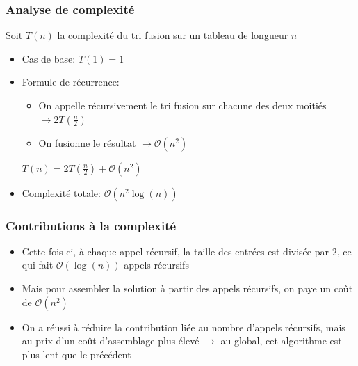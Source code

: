 \documentclass[aspectratio=169]{beamer}
\begin{document}
\begin{frame}
    \frametitle{Analyse de complexité}
    Soit \(T(n)\) la complexité du tri fusion sur un tableau de longueur \(n\)

    \begin{itemize}
    \item Cas de base: \(T(1) = 1\)
    \item Formule de récurrence:
      \begin{itemize}
      \item On appelle récursivement le tri fusion sur chacune des deux moitiés
        \(\to 2T(\frac{n}{2})\)
      \item On fusionne le résultat \(\to \mathcal{O}(n^{2})\)
      \end{itemize}
      \alert{\(T(n) = 2T(\frac{n}{2})+\mathcal{O}(n^{2})\)}

    \item Complexité totale: \(\mathcal{O}(n^{2}\log(n))\)
    \end{itemize}

\end{frame}

\begin{frame}
    \frametitle{Contributions à la complexité}

    \begin{itemize}
    \item Cette fois-ci, à chaque appel récursif, la taille des entrées est
      divisée par \(2\), ce qui fait \(\mathcal{O}(\log(n))\) appels récursifs
    \item Mais pour assembler la solution à partir des appels récursifs, on paye
      un coût de \(\mathcal{O}(n^{2})\)
    \item On a réussi à réduire la contribution liée au nombre d'appels
      récursifs, mais au prix d'un coût d'assemblage plus élevé \(\to\) au
      global, cet algorithme est plus lent que le précédent
    \end{itemize}
\end{frame}
\end{document}
